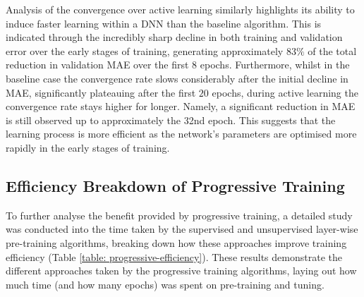 \documentclass[a4paper, 11pt]{report}
\begin{document}
    Analysis of the convergence over active learning similarly highlights its ability to induce faster learning within a DNN than the baseline algorithm. This is indicated through the incredibly sharp decline in both training and validation error over the early stages of training, generating approximately $83\%$ of the total reduction in validation MAE over the first $8$ epochs. Furthermore, whilst in the baseline case the convergence rate slows considerably after the initial decline in MAE, significantly plateauing after the first $20$ epochs, during active learning the convergence rate stays higher for longer. Namely, a significant reduction in MAE is still observed up to approximately the 32nd epoch. This suggests that the learning process is more efficient as the network's parameters are optimised more rapidly in the early stages of training.


    \subsection{Efficiency Breakdown of Progressive Training}

    To further analyse the benefit provided by progressive training, a detailed study was conducted into the time taken by the supervised and unsupervised layer-wise pre-training algorithms, breaking down how these approaches improve training efficiency (Table \ref{table: progressive-efficiency}). These results demonstrate the different approaches taken by the progressive training algorithms, laying out how much time (and how many epochs) was spent on pre-training and tuning. 
    
\end{document}
